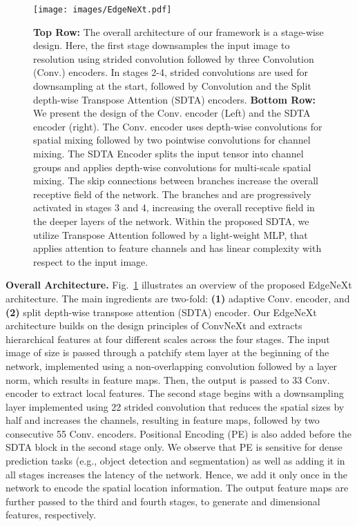 \documentclass[runningheads]{llncs}
\begin{document}
\begin{figure}[!t]
    \centering
    \texttt{[image: images/EdgeNeXt.pdf]}
    \caption{\textbf{Top Row:} The overall architecture of our framework is a stage-wise design. Here, the first stage downsamples the input image to  resolution using  strided convolution followed by three  Convolution (Conv.) encoders. In stages 2-4,  strided convolutions are used for downsampling at the start, followed by  Convolution and the Split depth-wise Transpose Attention (SDTA) encoders. \textbf{Bottom Row:} We present the design of the Conv. encoder (Left) and the SDTA encoder (right). The Conv. encoder uses  depth-wise convolutions for spatial mixing followed by two pointwise convolutions for channel mixing. The SDTA Encoder splits the input tensor into  channel groups and applies  depth-wise convolutions for multi-scale spatial mixing. The skip connections between branches increase the overall receptive field of the network. The branches  and  are progressively activated in stages 3 and 4, increasing the overall receptive field in the deeper layers of the network. Within the proposed SDTA, we utilize Transpose Attention followed by a light-weight MLP, that applies attention to feature channels and has linear complexity with respect to the input image.}
    \label{fig:Architecture}
\end{figure}

\noindent \textbf{Overall Architecture.} Fig.~\ref{fig:Architecture} illustrates an overview of the proposed EdgeNeXt architecture. The main ingredients are two-fold: \textbf{(1)} adaptive  Conv. encoder, and \textbf{(2)} split depth-wise transpose attention (SDTA) encoder. Our EdgeNeXt architecture builds on the design principles of ConvNeXt \cite{ConvNeXt} and extracts hierarchical features at four different scales across the four stages. The input image of size  is passed through a patchify stem layer at the beginning of the network, implemented using a  non-overlapping convolution followed by a layer norm, which results in  feature maps. Then, the output is passed to 33 Conv. encoder to extract local features. The second stage begins with a downsampling layer implemented using 22 strided convolution that reduces the spatial sizes by half and increases the channels, resulting in  feature maps, followed by two consecutive 55 Conv. encoders. Positional Encoding (PE) is also added before the SDTA block in the second stage only. 
We observe that PE is sensitive for dense prediction tasks (e.g., object detection and segmentation) as well as adding it in all stages increases the latency of the network.
Hence, we add it only once in the network to encode the spatial location information. The output feature maps are further passed to the third and fourth stages, to generate  and  dimensional features, respectively. 
\end{document}
